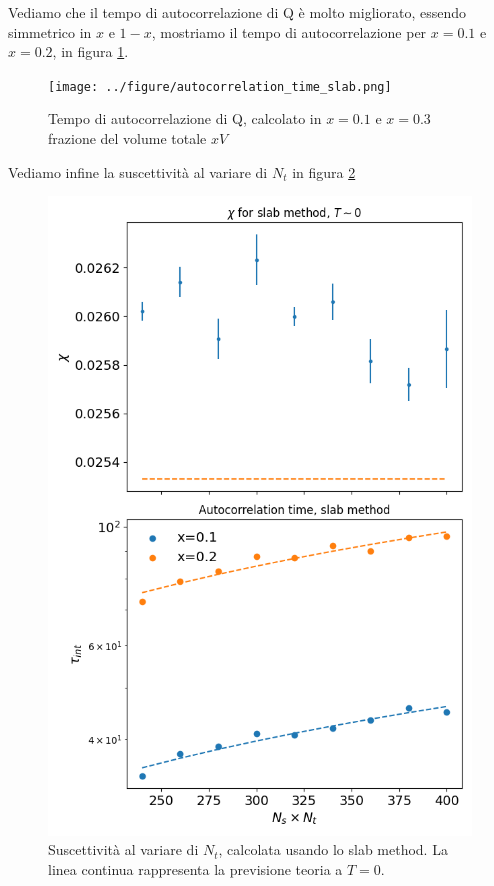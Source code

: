 \documentclass[a4paper, 12pt]{article}
\begin{document}
Vediamo che il tempo di autocorrelazione di Q è molto migliorato,
essendo simmetrico in $x$ e $1-x$, mostriamo il tempo di autocorrelazione
per $x=0.1$ e $x=0.2$, in figura \ref{autocorrelation_time_slab}.

\begin{figure}
\texttt{[image: ../figure/autocorrelation\_time\_slab.png]}
\caption{Tempo di autocorrelazione di Q, calcolato in $x=0.1$ e $x=0.3$ frazione
del volume totale $xV$}
\label{autocorrelation_time_slab}
\end{figure}

Vediamo infine la suscettività al variare di $N_t$ in figura \ref{suscettivity_slab}
\begin{figure}
\includegraphics[width=\linewidth]{../figure/suscettivity_slab.png}
\caption{Suscettività al variare di $N_t$, calcolata usando lo slab method.
La linea continua rappresenta la previsione teoria a $T=0$.}
\label{suscettivity_slab}
\end{figure}
\end{document}

